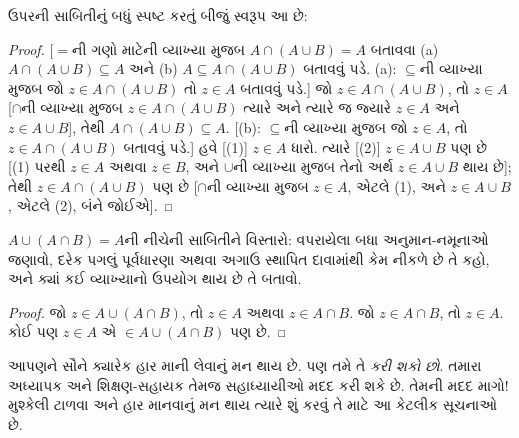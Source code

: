 ઉપરની સાબિતીનું બધું સ્પષ્ટ કરતું બીજું સ્વરૂપ આ છે:
\begin{proof}{}
[$=$ની ગણો માટેની વ્યાખ્યા મુજબ $A \cap (A \cup B) = A$
બતાવવા (a) $A \cap (A \cup B) \subseteq A$ અને
(b) $A \subseteq A \cap (A \cup B)$ બતાવવું પડે. (a): $\subseteq$ની વ્યાખ્યા
મુજબ જો $z \in A \cap (A \cup B)$ તો $z \in A$ બતાવવું પડે.]
જો $z \in A
\cap (A \cup B)$, તો $z \in A$ [$\cap$ની વ્યાખ્યા મુજબ
$z
  \in A \cap (A \cup B)$ ત્યારે અને ત્યારે જ જ્યારે
$z \in A$ અને $z \in A \cup B$], તેથી $A
\cap (A \cup B) \subseteq A$. [(b): $\subseteq$ની વ્યાખ્યા
મુજબ જો $z \in A$, તો $z \in A \cap (A \cup B)$ બતાવવું પડે.]
હવે [(1)] $z \in A$ ધારો. ત્યારે [(2)] $z \in A \cup B$ પણ છે
[(1) પરથી $z \in A$ અથવા $z \in B$, અને $\cup$ની વ્યાખ્યા
મુજબ તેનો અર્થ $z
  \in A \cup B$ થાય છે]; તેથી $z \in A \cap (A \cup B)$ પણ
છે [$\cap$ની વ્યાખ્યા મુજબ $z \in A$, એટલે (1), અને
$z
  \in A \cup B$, એટલે (2), બંને જોઈએ].
\end{proof}


\begin{prob}
$A \cup (A \cap B) = A$ની નીચેની સાબિતીને વિસ્તારો:
વપરાયેલા બધા અનુમાન-નમૂનાઓ જણાવો, દરેક પગલું પૂર્વધારણા
અથવા અગાઉ સ્થાપિત દાવામાંથી કેમ નીકળે છે તે કહો, અને
ક્યાં કઈ વ્યાખ્યાનો ઉપયોગ થાય છે તે બતાવો.
\begin{proof}
  જો $z \in A \cup (A \cap B)$, તો $z \in A$ અથવા
  $z \in A \cap B$. જો $z \in A \cap B$, તો $z \in A$.
  કોઈ પણ $z \in A$ એ $\in A \cup (A
  \cap B)$ પણ છે.
\end{proof}
\end{prob}
\endgroup


\begingroup
\makeatletter{}\makeatother


\label{guunit:OLP-0611}


આપણને સૌને ક્યારેક હાર માની લેવાનું મન થાય છે. પણ તમે તે
\emph{કરી શકો છો}. તમારા અધ્યાપક અને શિક્ષણ-સહાયક તેમજ
સહાધ્યાયીઓ મદદ કરી શકે છે. તેમની મદદ માગો!{} મુશ્કેલી
ટાળવા અને હાર માનવાનું મન થાય ત્યારે શું કરવું તે માટે
આ કેટલીક સૂચનાઓ છે.

